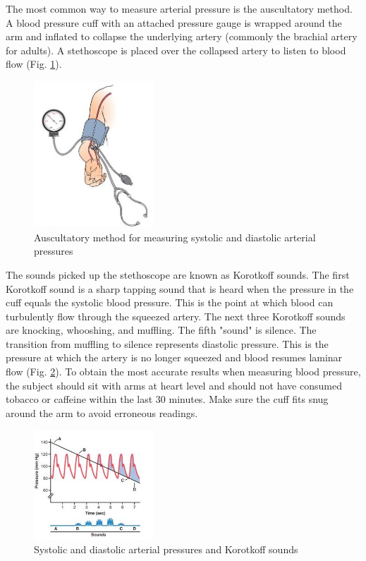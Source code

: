 \documentclass{article}
\begin{document}
The most common way to measure arterial pressure is the auscultatory method. A blood pressure cuff with an attached pressure gauge is wrapped around the arm and inflated to collapse the underlying artery (commonly the brachial artery for adults). A stethoscope is placed over the collapsed artery to listen to blood flow (Fig. \ref{method}).

\begin{figure}[h]
\centering\includegraphics[width=0.4\textwidth]{../images/BP_3.jpg}
\caption{Auscultatory method for measuring systolic and diastolic arterial pressures}
\label{method}
\end{figure}

The sounds picked up the stethoscope are known as Korotkoff sounds. The first Korotkoff sound is a sharp tapping sound that is heard when the pressure in the cuff equals the systolic blood pressure. This is the point at which blood can turbulently flow through the squeezed artery. The next three Korotkoff sounds are knocking, whooshing, and muffling. The fifth "sound" is silence. The transition from muffling to silence represents diastolic pressure. This is the pressure at which the artery is no longer squeezed and blood resumes laminar flow (Fig. \ref{sounds}). To obtain the most accurate results when measuring blood pressure, the subject should sit with arms at heart level and should not have consumed tobacco or caffeine within the last 30 minutes. Make sure the cuff fits snug around the arm to avoid erroneous readings.

\begin{figure}[h]
\centering\includegraphics[width=0.4\textwidth]{../images/BP_4.jpg}
\caption{Systolic and diastolic arterial pressures and Korotkoff sounds}
\label{sounds}
\end{figure}
\end{document}
